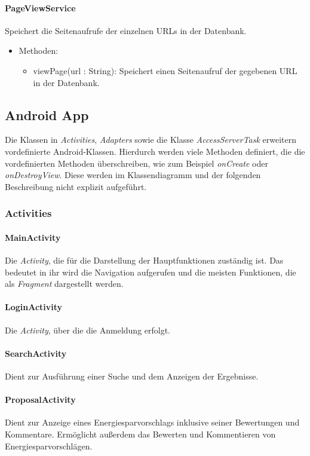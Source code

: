 	\paragraph{PageViewService}Speichert die Seitenaufrufe der einzelnen URLs in der Datenbank.
		\begin{itemize}
			\item Methoden:
			\begin{itemize}
				\item viewPage(url : String): Speichert einen Seitenaufruf der gegebenen URL in der Datenbank.
			\end{itemize}
		\end{itemize}

\subsection{Android App}
Die Klassen in \emph{Activities}, \emph{Adapters} sowie die Klasse \emph{AccessServerTask} erweitern vordefinierte Android-Klassen. Hierdurch werden viele Methoden definiert, die die vordefinierten Methoden überschreiben, wie zum Beispiel \emph{onCreate} oder \emph{onDestroyView}. Diese werden im Klassendiagramm und der folgenden Beschreibung nicht explizit aufgeführt.
\subsubsection{Activities}
\paragraph{MainActivity} Die \emph{Activity}, die für die Darstellung der Hauptfunktionen zuständig ist. Das bedeutet in ihr wird die Navigation aufgerufen und die meisten Funktionen, die als \emph{Fragment} dargestellt werden.
\paragraph{LoginActivity} Die \emph{Activity}, über die die Anmeldung erfolgt.
\paragraph{SearchActivity} Dient zur Ausführung einer Suche und dem Anzeigen der Ergebnisse.
\paragraph{ProposalActivity} Dient zur Anzeige eines Energiesparvorschlags inklusive seiner Bewertungen und Kommentare. Ermöglicht außerdem das Bewerten und Kommentieren von Energiesparvorschl\"agen.
